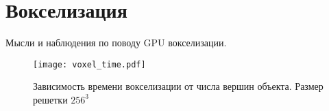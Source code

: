 \chapter{Вокселизация}

Мысли и наблюдения по поводу GPU вокселизации.

\begin{figure}[h]
\center
\texttt{[image: voxel\_time.pdf]}
\caption{Зависимость времени вокселизации от числа вершин объекта. Размер решетки $256^3$}
\label{fig:voxel_time}
\end{figure}

